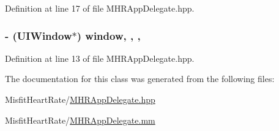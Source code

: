 Definition at line 17 of file M\+H\+R\+App\+Delegate.\+hpp.

\hypertarget{interface_m_h_r_app_delegate_ae07fbc2242a8ac6a6cca11d22a56dede}{
\subsubsection[{window}]{\setlength{\rightskip}{0pt plus 5cm}-\/ (U\+I\+Window$\ast$) window\hspace{0.3cm}{\ttfamily [read]}, {\ttfamily [write]}, {\ttfamily [nonatomic]}, {\ttfamily [strong]}}}\label{interface_m_h_r_app_delegate_ae07fbc2242a8ac6a6cca11d22a56dede}


Definition at line 13 of file M\+H\+R\+App\+Delegate.\+hpp.



The documentation for this class was generated from the following files\+:\begin{DoxyCompactItemize}
\item 
Misfit\+Heart\+Rate/\hyperlink{_m_h_r_app_delegate_8hpp}{M\+H\+R\+App\+Delegate.\+hpp}\item 
Misfit\+Heart\+Rate/\hyperlink{_m_h_r_app_delegate_8mm}{M\+H\+R\+App\+Delegate.\+mm}\end{DoxyCompactItemize}
